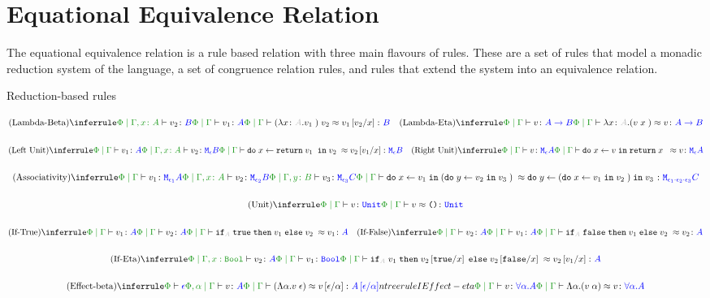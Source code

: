 \documentclass{report}
\begin{document}
\section{Equational Equivalence Relation}

The equational equivalence relation is a rule based relation with three main flavours of rules. These are a set of rules that model a monadic reduction system of the language, a set of congruence relation rules, and rules that extend the system into an equivalence relation.


Reduction-based rules
    \begin{framed}
        \[
            \scalebox{0.8}{$
            \ntreeruleII{Lambda-Beta}{\etyperelation{\P}{\gax}{v_2}{B}}{\gpetyperelation{v_1}{A}}{\gpeberelation{\apply{(\lam{x}{A}{v_1})}{v_2} }{ v_1\ssub{x}{v_2}}{B}}
            \quad
            \ntreeruleI{Lambda-Eta}{\gpetyperelation{v}{\ab}}{\gpeberelation{\lam{x}{A}{(\apply{v}{x}})}{v}{\ab}}
            $}
        \]
    
        \[\scalebox{0.8}{$
            \ntreeruleII{Left Unit}{\gpetyperelation{v_1}{A} }{ \etyperelation{\P}{\gax}{v_2}{\meb}}{\gpeberelation{\doin{x}{\return{v_1}}{v_2}}{v_2\ssub{x}{v_1}}{\meb}}
            \quad
            \ntreeruleI{Right Unit}{\gpetyperelation{v}{\mea}}{\gpeberelation{\doin{x}{v}{\return{x}} }{v}{\mea}}
        $}\]
    
        \[\scalebox{0.8}{$
            \ntreeruleIII{Associativity}{\gpetyperelation{v_1}{\M{\e_1}{A}} }{\etyperelation{\P}{\gax}{v_2}{\M{\e_2}{B}}}{ \etyperelation{\P}{\gby}{v_3}{\M{\e_3}{C}}}{
                \gpeberelation{\doin{x}{v_1}{(\doin{y}{v_2}{v_3})}}{\doin{y}{(\doin{x}{v_1}{v_2})}{v_3}}{\M{\e_1 \dot \e_2 \dot \e_3}{C}}
            }
        $}\]
    
        \[\scalebox{0.8}{$
            \ntreeruleI{Unit}{\gpetyperelation{v}{\U}}{\gpeberelation{v}{\u}{\U}}
        $}\]
    
        \[\scalebox{0.8}{$
            \ntreeruleII{If-True}{\gpetyperelation{v_1}{A}}{\gpetyperelation{v_2}{A}}{\gpeberelation{\pifthenelse{A}{\t}{v_1}{v_2}}{v_1}{A}}
            \quad
            \ntreeruleII{If-False}{\gpetyperelation{v_2}{A}}{\gpetyperelation{v_1}{A}}{\gpeberelation{\pifthenelse{A}{\f}{v_1}{v_2}}{v_2}{A}}    
        $}\]
    
        \[\scalebox{0.8}{$
            \ntreeruleII{If-Eta}{\etyperelation{\P}{\G, x: \B}{v_2}{A}}{\gpetyperelation{v_1}{\B}}{\gpeberelation{\pifthenelse{A}{v_1}{v_2\ssub{x}{\t}}{v_2\ssub{x}{\f}}}{v_2\ssub{x}{v_1}}{A}}
        $}\]
    
        \[\scalebox{0.8}{$
            \ntreeruleII{Effect-beta}{\wellformed{\P}{\e}}{\etyperelation{\P, \a}{\G}{v}{A}}{\gpeberelation{\eapp{(\elam{\a}{v}}{\e})}{v\ssub{\a}{\e}}{A\ssub{\a}{\e}}}
            \quad 
            \\ntreeruleI{Effect-eta}{\etyperelation{\P}{\G}{v}{\all{\a}{A}}}{\gpeberelation{\elam{\a}{(\eapp{v}{\a})}}{v}{\all{\a}{A}}}
        $}\]
    \end{framed}
\end{document}
